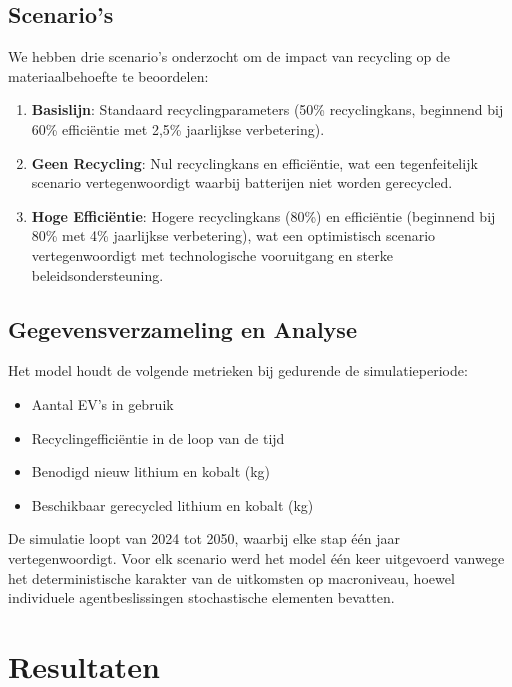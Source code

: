 \documentclass[10pt,a4paper,twocolumn]{article}
\begin{document}
\subsection{Scenario's}

We hebben drie scenario's onderzocht om de impact van recycling op de materiaalbehoefte te beoordelen:

\begin{enumerate}
    \item \textbf{Basislijn}: Standaard recyclingparameters (50\% recyclingkans, beginnend bij 60\% efficiëntie met 2,5\% jaarlijkse verbetering).
    \item \textbf{Geen Recycling}: Nul recyclingkans en efficiëntie, wat een tegenfeitelijk scenario vertegenwoordigt waarbij batterijen niet worden gerecycled.
    \item \textbf{Hoge Efficiëntie}: Hogere recyclingkans (80\%) en efficiëntie (beginnend bij 80\% met 4\% jaarlijkse verbetering), wat een optimistisch scenario vertegenwoordigt met technologische vooruitgang en sterke beleidsondersteuning.
\end{enumerate}

\subsection{Gegevensverzameling en Analyse}

Het model houdt de volgende metrieken bij gedurende de simulatieperiode:

\begin{itemize}
    \item Aantal EV's in gebruik
    \item Recyclingefficiëntie in de loop van de tijd
    \item Benodigd nieuw lithium en kobalt (kg)
    \item Beschikbaar gerecycled lithium en kobalt (kg)
\end{itemize}

De simulatie loopt van 2024 tot 2050, waarbij elke stap één jaar vertegenwoordigt. Voor elk scenario werd het model één keer uitgevoerd vanwege het deterministische karakter van de uitkomsten op macroniveau, hoewel individuele agentbeslissingen stochastische elementen bevatten.

\section{Resultaten}
\label{sec:results}
\end{document}
